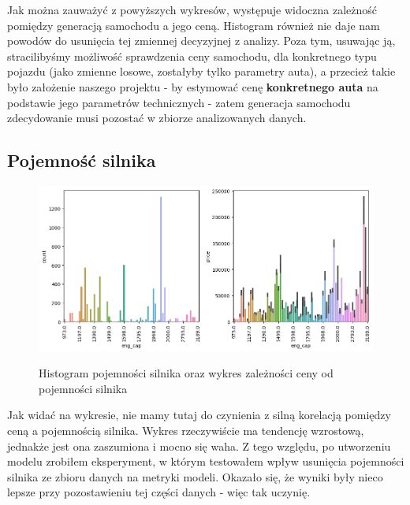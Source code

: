 \documentclass{article}
\begin{document}
Jak można zauważyć z powyższych wykresów, występuje widoczna zależność pomiędzy generacją samochodu a jego ceną. Histogram również nie daje nam powodów do usunięcia tej zmiennej decyzyjnej z analizy. Poza tym, usuwając ją, stracilibyśmy możliwość sprawdzenia ceny samochodu, dla konkretnego typu pojazdu (jako zmienne losowe, zostałyby tylko parametry auta), a przecież takie było założenie naszego projektu - by estymować cenę \textbf{konkretnego auta} na podstawie jego parametrów technicznych - zatem generacja samochodu zdecydowanie musi pozostać w zbiorze analizowanych danych. 

\subsection{Pojemność silnika}
\begin{figure}[H]
    \centering
    \includegraphics[width=1\linewidth]{images/pojemnosc_silnika.png}
    \label{plt:eng_cap}
    \caption{Histogram pojemności silnika oraz wykres zależności ceny od pojemności silnika}
\end{figure}

Jak widać na wykresie, nie mamy tutaj do czynienia z silną korelacją pomiędzy ceną a pojemnością silnika. Wykres rzeczywiście ma tendencję wzrostową, jednakże jest ona zaszumiona i mocno się waha. Z tego względu, po utworzeniu modelu zrobiłem eksperyment, w którym testowałem wpływ usunięcia pojemności silnika ze zbioru danych na metryki modeli. Okazało się, że wyniki były nieco lepsze przy pozostawieniu tej części danych - więc tak uczynię.
\end{document}
